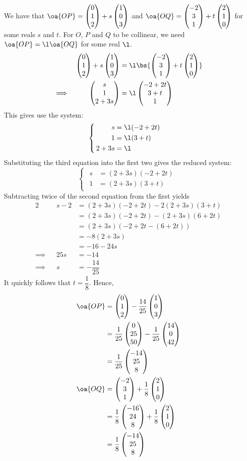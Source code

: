 \documentclass{echw}
\begin{document}
    \solution
        We have that $\oa{OP} = \cveciii012 + s\cveciii103$ and $\oa{OQ} = \cveciii{-2}31 + t\cveciii210$ for some reals $s$ and $t$. For $O$, $P$ and $Q$ to be collinear, we need $\oa{OP} = \l \oa{OQ}$ for some real $\l$.
        \begin{alignat*}{2}
            &&\cveciii012 + s\cveciii103 &= \l\bs{\cveciii{-2}31 + t\cveciii210}\\
            \implies&&\cveciii{s}1{2 + 3s} &= \l\cveciii{-2+2t}{3+t}1
        \end{alignat*}
        This gives use the system:
        \[
            \begin{cases}
                \begin{aligned}
                    s &= \l (-2 + 2t)\\
                    1 &= \l(3 + t)\\
                    2 + 3s &= \l 
                \end{aligned}
            \end{cases}
        \]
        Substituting the third equation into the first two gives the reduced system:
        \[
            \begin{cases}
                \begin{aligned}
                    s &= (2+3s)(-2+2t)\\
                    1 &= (2+3s)(3+t)
                \end{aligned}
            \end{cases}
        \]
        Subtracting twice of the second equation from the first yields
        \begin{alignat*}{2}
            &&s - 2 &= (2+3s)(-2+2t) - 2(2+3s)(3+t)\\
            && &= (2+3s)(-2+2t) - (2+3s)(6+2t)\\
            && &= (2+3s)(-2+2t - (6+2t))\\
            && &= -8(2+3s)\\
            && &= -16 - 24s\\
            \implies&&25s &= -14\\
            \implies&&s &= -\dfrac{14}{25}
        \end{alignat*}
        It quickly follows that $t = \dfrac18$. Hence,
        \begin{align*}
            \oa{OP} &= \cveciii012 - \dfrac{14}{25}\cveciii103\\
            &= \dfrac1{25}\cveciii0{25}{50} - \dfrac1{25}\cveciii{14}0{42}\\
            &= \dfrac1{25}\cveciii{-14}{25}{8}\\
            \oa{OQ} &= \cveciii{-2}31 + \dfrac18\cveciii210\\
            &= \dfrac18 \cveciii{-16}{24}{8} + \dfrac18 \cveciii210\\
            &= \dfrac18 \cveciii{-14}{25}8
        \end{align*}
\end{document}
